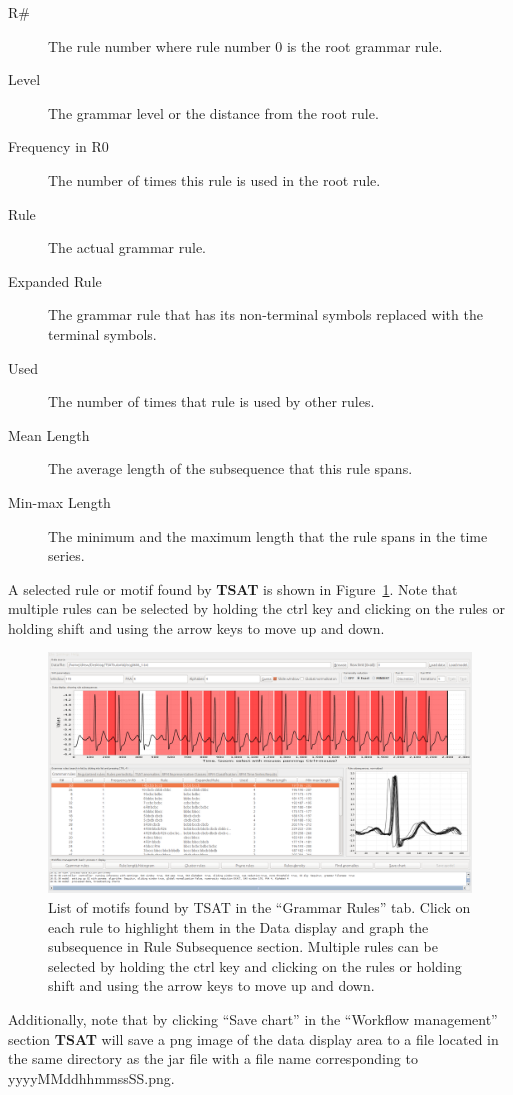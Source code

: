 \documentclass[titlepage, letterpaper, 12pt]{article}
\newcommand\TSAT{\textbf{TSAT}}
\begin{document}
\begin{description}
	\item[R\#] The rule number where rule number 0 is the root grammar rule.
	\item[Level]  The grammar level or the distance from the root rule.
	\item[Frequency in R0]  The number of times this rule is used in the root rule.
	\item[Rule] The actual grammar rule.
	\item[Expanded Rule]  The grammar rule that has its non-terminal symbols replaced with the terminal symbols.
	\item[Used]  The number of times that rule is used by other rules.
	\item[Mean Length] The average length of the subsequence that this rule spans.
	\item[Min-max Length] The minimum and the maximum length that the rule spans in the time series.
\end{description}

A selected rule or motif found by {\TSAT} is shown in Figure~\ref{fig:step3-motifs}.  Note that multiple rules can be selected by holding the ctrl key and clicking on the rules or holding shift and using the arrow keys to move up and down.

\begin{figure}[H]
	\centering
	\includegraphics[width=0.7\linewidth]{pictures/motifguide/step3-motifs}
	\caption{List of motifs found by TSAT in the ``Grammar Rules'' tab.  Click on each rule to highlight them in the Data display and graph the subsequence in Rule Subsequence section.  Multiple rules can be selected by holding the ctrl key and clicking on the rules or holding shift and using the arrow keys to move up and down.}
	\label{fig:step3-motifs}
\end{figure}

Additionally, note that by clicking ``Save chart'' in the ``Workflow management'' section {\TSAT} will save a png image of the data display area to a file located in the same directory as the jar file with a file name corresponding to yyyyMMddhhmmssSS.png.
\end{document}
